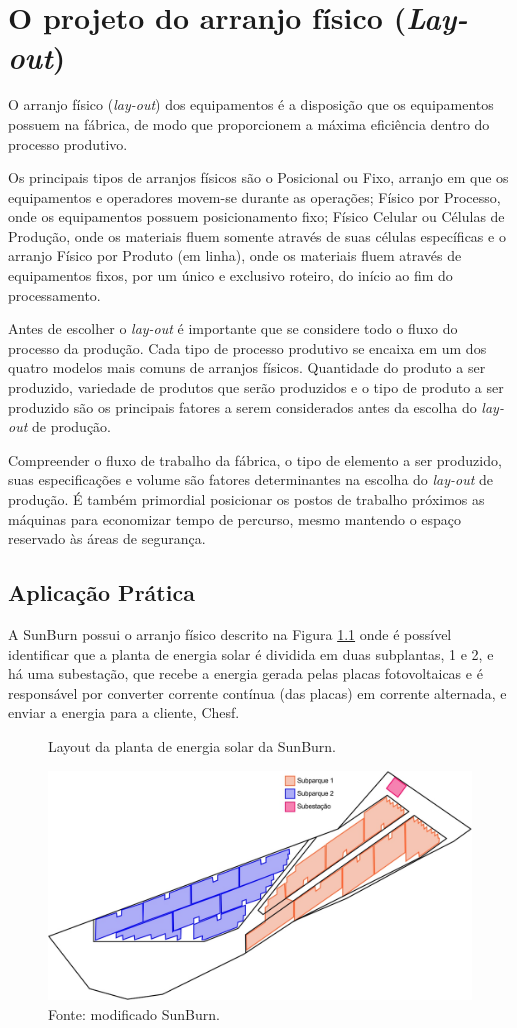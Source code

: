 \chapter{O projeto do arranjo físico (\textit{Lay-out})}
\label{chap:projeto_do_arranjo}
O arranjo físico (\textit{lay-out}) dos equipamentos é a disposição que os equipamentos possuem na fábrica, de modo que proporcionem a máxima eficiência dentro do processo produtivo.

Os principais tipos de arranjos físicos são o Posicional ou Fixo, arranjo em que os equipamentos e operadores movem-se durante as operações; Físico por Processo, onde os equipamentos possuem posicionamento fixo; Físico Celular ou Células de Produção, onde os materiais fluem somente através de suas células específicas e o arranjo Físico por Produto (em linha), onde os materiais fluem através de equipamentos fixos, por um único e exclusivo roteiro, do início ao fim do processamento.

Antes de escolher o \textit{lay-out} é importante que se considere todo o fluxo do processo da produção. Cada tipo de processo produtivo se encaixa em um dos quatro modelos mais comuns de arranjos físicos. Quantidade do produto a ser produzido, variedade de produtos que serão produzidos e o tipo de produto a ser produzido são os principais fatores a serem considerados antes da escolha do \textit{lay-out} de produção.

Compreender o fluxo de trabalho da fábrica, o tipo de elemento a ser produzido, suas especificações e volume são fatores determinantes na escolha do \textit{lay-out} de produção. É também primordial posicionar os postos de trabalho próximos as máquinas para economizar tempo de percurso, mesmo mantendo o espaço reservado às áreas de segurança.

\section{Aplicação Prática}
\label{sec:projeto_do_arranjo_aplicacao}
A SunBurn possui o arranjo físico descrito na Figura \ref{fig:arranjo_fisico_aplicacao} onde é possível identificar que a planta de energia solar é dividida em duas subplantas, 1 e 2, e há uma subestação, que recebe a energia gerada pelas placas fotovoltaicas e é responsável por converter corrente contínua (das placas) em corrente alternada, e enviar a energia para a cliente, Chesf.


\begin{figure}[H]
    \caption{Layout da planta de energia solar da SunBurn.} 
    \includegraphics[width=1\textwidth]{images/layout.jpg}
    \caption*{Fonte: modificado SunBurn.}
    \label{fig:arranjo_fisico_aplicacao}
  \end{figure}